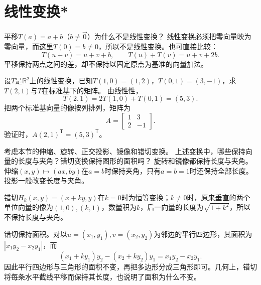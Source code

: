 \par\addvspace{12pt}

\section{线性变换*}

\label{sol:sec:vector:4}

平移\(T \left( a \right) = a + b\)（\(b \ne \vec{0}\)）为什么不是线性变换？
\solutionanswer
线性变换必须把零向量映为零向量，而这里\(T(0)=b\ne0\)，所以不是线性变换。也可直接比较：
\[
T(u+v)=u+v+b,\qquad T(u)+T(v)=u+v+2b.
\]
平移保持两点之间的差，却不保持以固定原点为基准的向量加法。


设\(T\)是\(\mathbb{R}^{2}\)上的线性变换，已知\(T \left( 1 , 0 \right) = \left( 1 , 2 \right)\)，\(T \left( 0 , 1 \right) = \left( 3 , - 1 \right)\)，求\(T \left( 2 , 1 \right)\)与\(T\)在标准基下的矩阵。
\solutionanswer
由线性性，
\[
T(2,1)=2T(1,0)+T(0,1)=(5,3).
\]
把两个标准基向量的像按列排列，矩阵为
\[
A=\begin{bmatrix}1&3\\2&-1\end{bmatrix}.
\]
验证时，\(A(2,1)^{\mathsf T}=(5,3)^{\mathsf T}\)。


考虑本节的伸缩、旋转、正交投影、镜像和错切变换。 上述变换中，哪些保持向量的长度与夹角？错切变换保持图形的面积吗？
\solutionanswer
旋转和镜像都保持长度与夹角。伸缩\((x,y)\mapsto(ax,by)\)在\(a=b\)时保持夹角，只有\(a=b=1\)时还保持全部长度。投影一般改变长度与夹角。

错切\(H_k(x,y)=(x+ky,y)\)在\(k=0\)时为恒等变换；\(k\ne0\)时，原来垂直的两个单位向量的像为\((1,0),(k,1)\)，数量积为\(k\)，后一向量的长度为\(\sqrt{1+k^2}\)，所以不保持长度与夹角。

错切保持面积。对以\(u=(x_1,y_1),v=(x_2,y_2)\)为邻边的平行四边形，其面积为\(|x_1y_2-x_2y_1|\)，而
\[
(x_1+ky_1)y_2-(x_2+ky_2)y_1=x_1y_2-x_2y_1.
\]
因此平行四边形与三角形的面积不变，再把多边形分成三角形即可。几何上，错切将每条水平截线平移而保持其长度，也说明了面积为什么不变。


